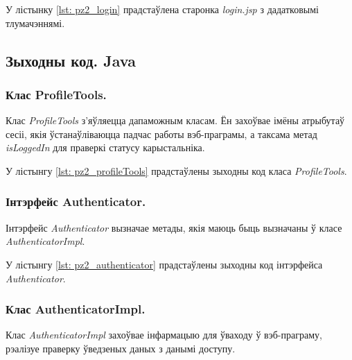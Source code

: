 У лістынку \ref{lst: pz2_login} прадстаўлена старонка
\textit{login.jsp} з дадатковымі тлумачэннямі.



\subsection{Зыходны код. Java}

\subsubsection{Клас ProfileTools.}

Клас \textit{ProfileTools} з'яўляецца дапаможным класам.
Ён захоўвае імёны атрыбутаў сесіі, якія ўстанаўліваюцца
падчас работы вэб-праграмы, а таксама метад
\textit{isLoggedIn} для праверкі статусу карыстальніка.

У лістынгу \ref{lst: pz2_profileTools} прадстаўлены зыходны код класа \textit{ProfileTools}.



\subsubsection{Інтэрфейс Authenticator.}

Інтэрфейс \textit{Authenticator} вызначае метады, якія маюць
быць вызначаны ў класе \textit{Au\-then\-ti\-ca\-tor\-Impl}.

У лістынгу \ref{lst: pz2_authenticator} прадстаўлены зыходны код інтэрфейса \textit{Authenticator}.



\subsubsection{Клас AuthenticatorImpl.}

Клас \textit{AuthenticatorImpl} захоўвае інфармацыю для ўваходу ў
вэб-праграму, рэалізуе праверку ўведзеных даных з данымі доступу.

